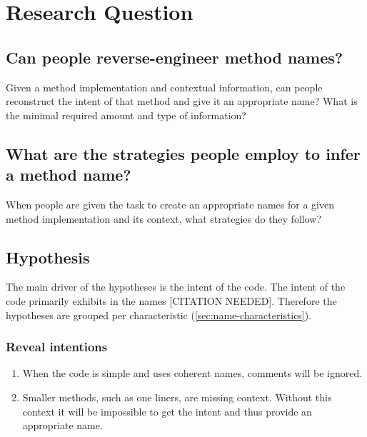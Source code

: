 \section{Research Question}

\subsection{Can people reverse-engineer method names?}
Given a method implementation and contextual information, can people reconstruct the intent of that method and give it an appropriate name? What is the minimal required amount and type of information?

\subsection{What are the strategies people employ to infer a method name?}
When people are given the task to create an appropriate names for a given method implementation and its context, what strategies do they follow? 

\subsection{Hypothesis}

The main driver of the hypotheses is the intent of the code. The intent of the code primarily exhibits in the names {\color{red}[CITATION NEEDED]}. Therefore the hypotheses are grouped per characteristic (\ref{sec:name-characteristics}).


\subsubsection{Reveal intentions}
\begin{enumerate}
\item When the code is simple and uses coherent names, comments will be ignored.
\item Smaller methods, such as one liners, are missing context. Without this context it will be impossible to get the intent and thus provide an appropriate name.
\end{enumerate}


